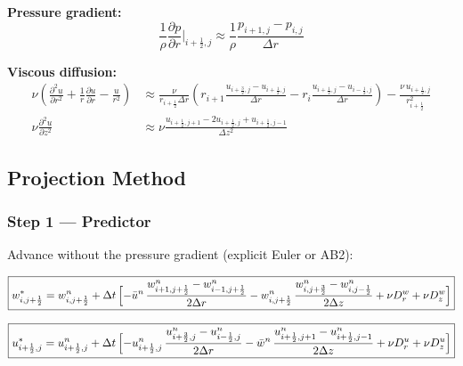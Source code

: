 \textbf{Pressure gradient:}
\begin{equation}
    \frac{1}{\rho}\frac{\partial p}{\partial r}\bigg|_{i+\frac{1}{2},j}
    \approx \frac{1}{\rho}\frac{p_{i+1,j}-p_{i,j}}{\Delta r}
\end{equation}

\textbf{Viscous diffusion:}
\begin{align}
    \nu\!\left(\frac{\partial^2 u}{\partial r^2}+\frac{1}{r}\frac{\partial u}{\partial r}-\frac{u}{r^2}\right)
    &\approx \frac{\nu}{r_{i+\frac{1}{2}}\Delta r}\left(
       r_{i+1}\frac{u_{i+\frac{3}{2},j}-u_{i+\frac{1}{2},j}}{\Delta r}
      -r_i\frac{u_{i+\frac{1}{2},j}-u_{i-\frac{1}{2},j}}{\Delta r}
    \right) - \frac{\nu\,u_{i+\frac{1}{2},j}}{r_{i+\frac{1}{2}}^2}
    \\[4pt]
    \nu\frac{\partial^2 u}{\partial z^2}
    &\approx \nu\frac{u_{i+\frac{1}{2},j+1}-2u_{i+\frac{1}{2},j}+u_{i+\frac{1}{2},j-1}}{\Delta z^2}
\end{align}

\subsection{Projection Method}

\subsubsection{Step 1 --- Predictor}

Advance without the pressure gradient (explicit Euler or AB2):

\begin{equation}
\boxed{
w^{*}_{i,j+\frac{1}{2}} = w^n_{i,j+\frac{1}{2}} + \Delta t\,\Bigl[
  -\bar{u}^n\,\frac{w^n_{i+1,j+\frac{1}{2}}-w^n_{i-1,j+\frac{1}{2}}}{2\Delta r}
  -w^n_{i,j+\frac{1}{2}}\,\frac{w^n_{i,j+\frac{3}{2}}-w^n_{i,j-\frac{1}{2}}}{2\Delta z}
  +\nu D_r^w + \nu D_z^w
\Bigr]
}
\label{eq:cyl_uw_pred_w}
\end{equation}

\begin{equation}
\boxed{
u^{*}_{i+\frac{1}{2},j} = u^n_{i+\frac{1}{2},j} + \Delta t\,\Bigl[
  -u^n_{i+\frac{1}{2},j}\,\frac{u^n_{i+\frac{3}{2},j}-u^n_{i-\frac{1}{2},j}}{2\Delta r}
  -\bar{w}^n\,\frac{u^n_{i+\frac{1}{2},j+1}-u^n_{i+\frac{1}{2},j-1}}{2\Delta z}
  +\nu D_r^u + \nu D_z^u
\Bigr]
}
\label{eq:cyl_uw_pred_u}
\end{equation}

